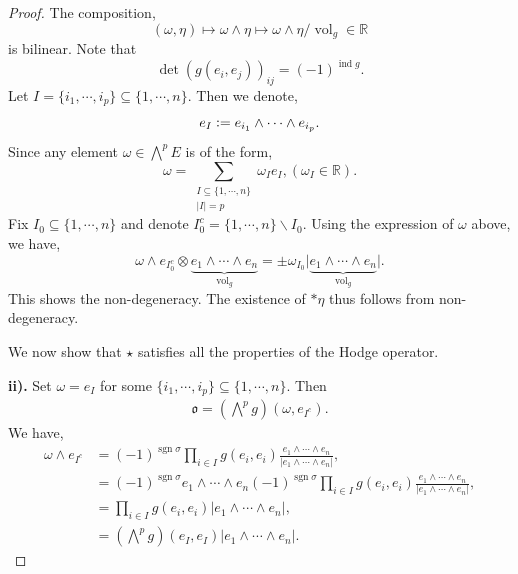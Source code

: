 \documentclass[10pt]{article}
\DeclareMathOperator{\ind}{ind}
\DeclareMathOperator{\sgn}{sgn}
\DeclareMathOperator{\vol}{vol}
\newcommand{\defeq}{\vcentcolon=}
\newcommand{\R}[0]{\mathbb{R}}
\begin{document}
\begin{proof}
  The composition,
  \begin{equation*}
    (\omega,\eta)\mapsto\omega\wedge\eta\mapsto \omega\wedge\eta/\vol_g\in\R
  \end{equation*}
  is bilinear. Note that 
  \begin{equation*}
    \det(g(e_i,e_j))_{ij} = (-1)^{\ind g}.
  \end{equation*}
  Let $I = \{i_1,\cdots,i_p\}\subseteq\{1,\cdots,n\}$. Then we denote,
  \begin{equation*}
    e_I\defeq e_{i_1}\wedge\cdots\wedge e_{i_p}.
  \end{equation*}
  Since any element $\omega\in\bigwedge^pE$ is of the form,
  \begin{equation*}
    \omega = \sum_{\substack{I\subseteq\{1,\cdots,n\}\\\vert I \vert = p}}\omega_Ie_I, (\omega_I\in\R).
  \end{equation*}
Fix $I_0\subseteq\{1,\cdots,n\}$ and denote $I_0^c = \{1,\cdots,n\}\backslash I_0$. Using the expression of $\omega$ above, we have,
\begin{equation*}
\omega\wedge e_{I_0^c}\otimes \underbrace{e_1\wedge\cdots\wedge e_n}_{\vol_g} = \pm\omega_{I_0}\vert \underbrace{e_1\wedge\cdots\wedge e_n}_{\vol_g}\vert.
\end{equation*}
This shows the non-degeneracy. The existence of $\ast\eta$ thus follows from non-degeneracy. 
\par We now show that $\star$ satisfies all the properties of  the Hodge operator.
\par\textbf{ii).}
Set $\omega = e_{I}$ for some $\{i_1,\cdots,i_p\}\subseteq\{1,\cdots,n\}$. Then 
\begin{align*}
  \mathfrak{o} = \left(\bigwedge^pg\right)(\omega,e_{I^c}).
\end{align*}
We have,
\begin{align*}
  \omega\wedge e_{I^c} &= (-1)^{\sgn\sigma}\prod_{i\in I}g(e_i,e_i){\frac {e_1\wedge\cdots\wedge e_n} {\vert e_1\wedge\cdots\wedge e_n\vert}},\\
& = (-1)^{\sgn\sigma}e_1\wedge\cdots\wedge e_n(-1)^{\sgn\sigma}\prod_{i\in I}g(e_i,e_i){\frac {e_1\wedge\cdots\wedge e_n} {\vert e_1\wedge\cdots\wedge e_n\vert}},\\
& = \prod_{i\in I}g(e_i,e_i)\vert e_1\wedge\cdots\wedge e_n\vert,\\
& = \left(\bigwedge^pg\right)(e_I,e_I)\vert e_1\wedge\cdots\wedge e_n\vert.
\end{align*}

\end{proof}
\end{document}
